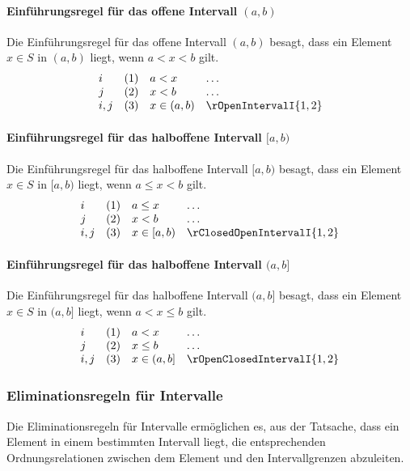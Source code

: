 \documentclass{book}
\theoremstyle{plain}
\theoremstyle{remark}
\theoremstyle{definition}
\begin{document}
\paragraph{Einführungsregel für das offene Intervall \((a, b)\)}
Die Einführungsregel für das offene Intervall \((a, b)\) besagt, dass ein Element \(x \in S\) in \((a, b)\) liegt, wenn \(a < x < b\) gilt.
\[
\begin{array}{llll}
    i   & (1) & a < x & \dots \\
    j   & (2) & x < b & \dots \\
    i,j & (3) & x \in (a, b) & \rOpenIntervalI{1,2}
\end{array}
\]

\paragraph{Einführungsregel für das halboffene Intervall \([a, b)\)}
Die Einführungsregel für das halboffene Intervall \([a, b)\) besagt, dass ein Element \(x \in S\) in \([a, b)\) liegt, wenn \(a \leq x < b\) gilt.
\[
\begin{array}{llll}
    i   & (1) & a \leq x & \dots \\
    j   & (2) & x < b & \dots \\
    i,j & (3) & x \in [a, b) & \rClosedOpenIntervalI{1,2}
\end{array}
\]

\paragraph{Einführungsregel für das halboffene Intervall \((a, b]\)}
Die Einführungsregel für das halboffene Intervall \((a, b]\) besagt, dass ein Element \(x \in S\) in \((a, b]\) liegt, wenn \(a < x \leq b\) gilt.
\[
\begin{array}{llll}
    i   & (1) & a < x & \dots \\
    j   & (2) & x \leq b & \dots \\
    i,j & (3) & x \in (a, b] & \rOpenClosedIntervalI{1,2}
\end{array}
\]

\subsubsection{Eliminationsregeln für Intervalle}
\label{rule:rClosedIntervalE} \label{rule:rOpenIntervalE} \label{rule:rClosedOpenIntervalE} \label{rule:rOpenClosedIntervalE}

Die Eliminationsregeln für Intervalle ermöglichen es, aus der Tatsache, dass ein Element in einem bestimmten Intervall liegt, die entsprechenden Ordnungsrelationen zwischen dem Element und den Intervallgrenzen abzuleiten.
\end{document}
